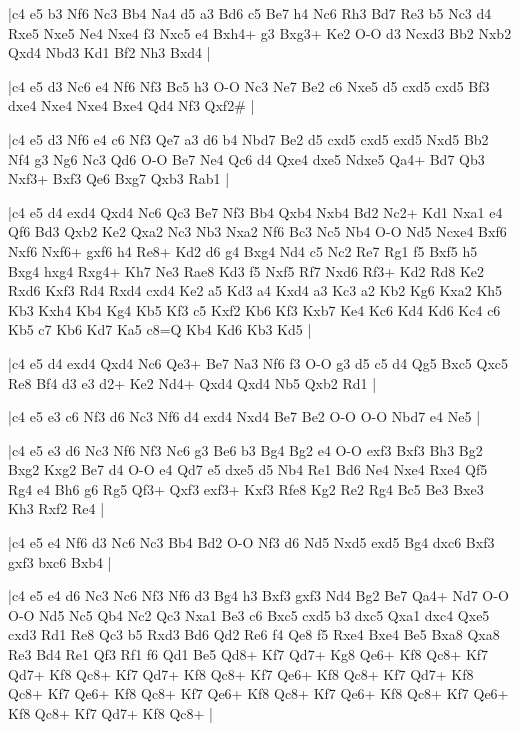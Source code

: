 \whitename{}
\blackname{}
\makegametitle
|c4 e5 b3 Nf6 Nc3 Bb4 Na4 d5 a3 Bd6 c5 Be7 h4 Nc6 Rh3 Bd7 Re3 b5 Nc3 d4 Rxe5 Nxe5 Ne4 Nxe4 f3 Nxc5 e4 Bxh4+ g3 Bxg3+ Ke2 O-O d3 Ncxd3 Bb2 Nxb2 Qxd4 Nbd3 Kd1 Bf2 Nh3 Bxd4  |

\whitename{}
\blackname{}
\makegametitle
|c4 e5 d3 Nc6 e4 Nf6 Nf3 Bc5 h3 O-O Nc3 Ne7 Be2 c6 Nxe5 d5 cxd5 cxd5 Bf3 dxe4 Nxe4 Nxe4 Bxe4 Qd4 Nf3 Qxf2\#  |

\whitename{}
\blackname{}
\makegametitle
|c4 e5 d3 Nf6 e4 c6 Nf3 Qe7 a3 d6 b4 Nbd7 Be2 d5 cxd5 cxd5 exd5 Nxd5 Bb2 Nf4 g3 Ng6 Nc3 Qd6 O-O Be7 Ne4 Qc6 d4 Qxe4 dxe5 Ndxe5 Qa4+ Bd7 Qb3 Nxf3+ Bxf3 Qe6 Bxg7 Qxb3 Rab1  |

\whitename{}
\blackname{}
\makegametitle
|c4 e5 d4 exd4 Qxd4 Nc6 Qc3 Be7 Nf3 Bb4 Qxb4 Nxb4 Bd2 Nc2+ Kd1 Nxa1 e4 Qf6 Bd3 Qxb2 Ke2 Qxa2 Nc3 Nb3 Nxa2 Nf6 Bc3 Nc5 Nb4 O-O Nd5 Ncxe4 Bxf6 Nxf6 Nxf6+ gxf6 h4 Re8+ Kd2 d6 g4 Bxg4 Nd4 c5 Nc2 Re7 Rg1 f5 Bxf5 h5 Bxg4 hxg4 Rxg4+ Kh7 Ne3 Rae8 Kd3 f5 Nxf5 Rf7 Nxd6 Rf3+ Kd2 Rd8 Ke2 Rxd6 Kxf3 Rd4 Rxd4 cxd4 Ke2 a5 Kd3 a4 Kxd4 a3 Kc3 a2 Kb2 Kg6 Kxa2 Kh5 Kb3 Kxh4 Kb4 Kg4 Kb5 Kf3 c5 Kxf2 Kb6 Kf3 Kxb7 Ke4 Kc6 Kd4 Kd6 Kc4 c6 Kb5 c7 Kb6 Kd7 Ka5 c8=Q Kb4 Kd6 Kb3 Kd5  |

\whitename{}
\blackname{}
\makegametitle
|c4 e5 d4 exd4 Qxd4 Nc6 Qe3+ Be7 Na3 Nf6 f3 O-O g3 d5 c5 d4 Qg5 Bxc5 Qxc5 Re8 Bf4 d3 e3 d2+ Ke2 Nd4+ Qxd4 Qxd4 Nb5 Qxb2 Rd1  |

\whitename{}
\blackname{}
\makegametitle
|c4 e5 e3 c6 Nf3 d6 Nc3 Nf6 d4 exd4 Nxd4 Be7 Be2 O-O O-O Nbd7 e4 Ne5  |

\whitename{}
\blackname{}
\makegametitle
|c4 e5 e3 d6 Nc3 Nf6 Nf3 Nc6 g3 Be6 b3 Bg4 Bg2 e4 O-O exf3 Bxf3 Bh3 Bg2 Bxg2 Kxg2 Be7 d4 O-O e4 Qd7 e5 dxe5 d5 Nb4 Re1 Bd6 Ne4 Nxe4 Rxe4 Qf5 Rg4 e4 Bh6 g6 Rg5 Qf3+ Qxf3 exf3+ Kxf3 Rfe8 Kg2 Re2 Rg4 Bc5 Be3 Bxe3 Kh3 Rxf2 Re4  |

\whitename{}
\blackname{}
\makegametitle
|c4 e5 e4 Nf6 d3 Nc6 Nc3 Bb4 Bd2 O-O Nf3 d6 Nd5 Nxd5 exd5 Bg4 dxc6 Bxf3 gxf3 bxc6 Bxb4  |

\whitename{}
\blackname{}
\makegametitle
|c4 e5 e4 d6 Nc3 Nc6 Nf3 Nf6 d3 Bg4 h3 Bxf3 gxf3 Nd4 Bg2 Be7 Qa4+ Nd7 O-O O-O Nd5 Nc5 Qb4 Nc2 Qc3 Nxa1 Be3 c6 Bxc5 cxd5 b3 dxc5 Qxa1 dxc4 Qxe5 cxd3 Rd1 Re8 Qc3 b5 Rxd3 Bd6 Qd2 Re6 f4 Qe8 f5 Rxe4 Bxe4 Be5 Bxa8 Qxa8 Re3 Bd4 Re1 Qf3 Rf1 f6 Qd1 Be5 Qd8+ Kf7 Qd7+ Kg8 Qe6+ Kf8 Qc8+ Kf7 Qd7+ Kf8 Qc8+ Kf7 Qd7+ Kf8 Qc8+ Kf7 Qe6+ Kf8 Qc8+ Kf7 Qd7+ Kf8 Qc8+ Kf7 Qe6+ Kf8 Qc8+ Kf7 Qe6+ Kf8 Qc8+ Kf7 Qe6+ Kf8 Qc8+ Kf7 Qe6+ Kf8 Qc8+ Kf7 Qd7+ Kf8 Qc8+  |

